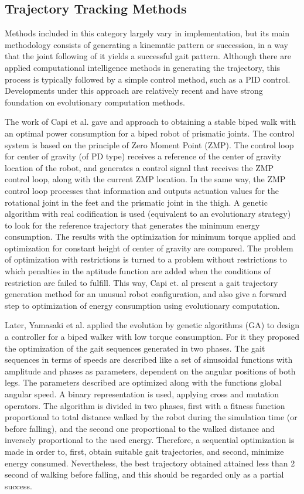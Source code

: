 \subsection{Trajectory Tracking Methods}
Methods included in this category largely vary in implementation, but
its main methodology consists of generating a kinematic pattern or
succession, in a way that the joint following of it yields a
successful gait pattern. Although there are applied computational
intelligence methods in generating the trajectory, this process is
typically followed by a simple control method, such as a PID
control. Developments under this approach are relatively recent and
have strong foundation on evolutionary computation methods.


The work of Capi et al. \cite{Capi02Optimal} gave and approach to
obtaining a stable biped walk with an optimal power consumption for a
biped robot of prismatic joints. The control system is based on the
principle of Zero Moment Point (ZMP). The control loop for center of
gravity (of PD type) receives a reference of the center of gravity
location of the robot, and generates a control signal that receives
the ZMP control loop, along with the current ZMP location. In the same
way, the ZMP control loop processes that information and outputs
actuation values for the rotational joint in the feet and the
prismatic joint in the thigh. A genetic algorithm with real
codification is used (equivalent to an evolutionary strategy) to look
for the reference trajectory that generates the minimum energy
consumption. The results with the optimization for minimum torque
applied and optimization for constant height of center of gravity are
compared. The problem of optimization with restrictions is turned to a
problem without restrictions to which penalties in the aptitude
function are added when the conditions of restriction are failed to
fulfill. This way, Capi et. al present a gait trajectory generation
method for an unusual robot configuration, and also give a forward
step to optimization of energy consumption using evolutionary
computation.


Later, Yamasaki et al. \cite{Yamasaki03Control} applied the evolution
by genetic algorithms (GA) to design a controller for a biped walker
with low torque consumption. For it they proposed the optimization of
the gait sequences generated in two phases. The gait sequences in
terms of speeds are described like a set of sinusoidal functions with
amplitude and phases as parameters, dependent on the angular positions
of both legs. The parameters described are optimized along with the
functions global angular speed. A binary representation is used,
applying cross and mutation operators. The algorithm is divided in two
phases, first with a fitness function proportional to total distance
walked by the robot during the simulation time (or before falling),
and the second one proportional to the walked distance and inversely
proportional to the used energy. Therefore, a sequential optimization
is made in order to, first, obtain suitable gait trajectories, and
second, minimize energy consumed. Nevertheless, the best trajectory
obtained attained less than 2 second of walking before falling, and
this should be regarded only as a partial success.


